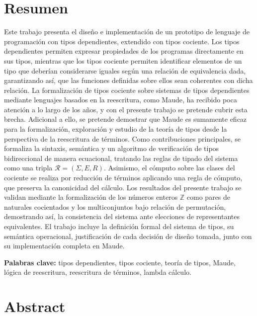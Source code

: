 





\section*{Resumen}

Este trabajo presenta el diseño e implementación de un prototipo de lenguaje de programación con tipos dependientes, extendido con tipos cociente. Los tipos dependientes permiten expresar propiedades de los programas directamente en sus tipos, mientras que los tipos cociente permiten identificar elementos de un tipo que deberían considerarse iguales según una relación de equivalencia dada, garantizando así, que las funciones definidas sobre ellos sean coherentes con dicha relación. La formalización de tipos cociente sobre sistemas de tipos dependientes mediante lenguajes basados en la reescritura, como Maude, ha recibido poca atención a lo largo de los años, y con el presente trabajo se pretende cubrir esta brecha. Adicional a ello, se pretende demostrar que Maude es sumamente eficaz para la formalización, exploración y estudio de la teoría de tipos desde la perspectiva de la reescritura de términos. Como contribuciones principales, se formaliza la sintaxis, semántica y un algoritmo de verificación de tipos bidireccional de manera ecuacional, tratando las reglas de tipado del sistema como una tripla $\mathcal{R} = (\Sigma, E, R)$. Asimismo, el cómputo sobre las clases del cociente se realiza por reducción de términos aplicando una regla de cómputo, que preserva la canonicidad del cálculo. Los resultados del presente trabajo se validan mediante la formalización de los números enteros $\mathbb{Z}$ como pares de naturales cocientados y los multiconjuntos bajo relación de permutación, demostrando así, la consistencia del sistema ante elecciones de representantes equivalentes. El trabajo incluye la definición formal del sistema de tipos, su semántica operacional, justificación de cada decisión de diseño tomada, junto con su implementación completa en Maude.

\vspace{1em}
\noindent\textbf{Palabras clave:} tipos dependientes, tipos cociente, teoría de tipos, Maude, lógica de reescritura, reescritura de términos, lambda cálculo.

\newpage
\section*{Abstract}

